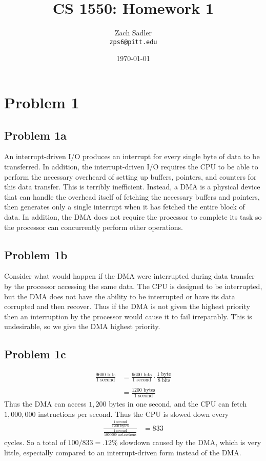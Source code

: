 \documentclass[12pt]{article}
\title{CS 1550: Homework 1}
\author{Zach Sadler \\
			 \texttt{zps6@pitt.edu}}
\date{\today}
\begin{document}
\maketitle
\section*{Problem 1}
	\subsection*{Problem 1a}
An interrupt-driven I/O produces an interrupt for every single byte of data to be transferred. In addition, the interrupt-driven I/O requires the CPU to be able to perform the necessary overheard of setting up buffers, pointers, and counters for this data transfer. This is terribly inefficient. Instead, a DMA is a physical device that can handle the overhead itself of fetching the necessary buffers and pointers, then generates only a single interrupt when it has fetched the entire block of data. In addition, the DMA does not require the processor to complete its task so the processor can concurrently perform other operations.

	\subsection*{Problem 1b}
Consider what would happen if the DMA were interrupted during data transfer by the processor accessing the same data. The CPU is designed to be interrupted, but the DMA does not have the ability to be interrupted or have its data corrupted and then recover. Thus if the DMA is not given the highest priority then an interruption by the processor would cause it to fail irreparably. This is undesirable, so we give the DMA highest priority.

	\subsection*{Problem 1c}
\begin{align*}
	\frac{9600 \text{ bits}}{1 \text{ second}} &= 
	\frac{9600 \text{ bits}}{1 \text{ second}} \cdot \frac{1 \text{ byte}}{8 \text{ bits}} \\ \\
	&= \frac{1200 \text{ bytes}}{1 \text{ second}}
\end{align*}
Thus the DMA can access $1,200$ bytes in one second, and the CPU can fetch $1,000,000$ instructions per second. Thus the CPU is slowed down every
\begin{align*}
	\frac{ \frac{1 \text{ second}} {1200 \text{ bytes}} }
	       { \frac{1 \text{ second}} {1000000 \text{ instructions}} } &= 833
\end{align*}
cycles. So a total of $100/833 = .12\%$ slowdown caused by the DMA, which is very little, especially compared to an interrupt-driven form instead of the DMA.
\end{document}
